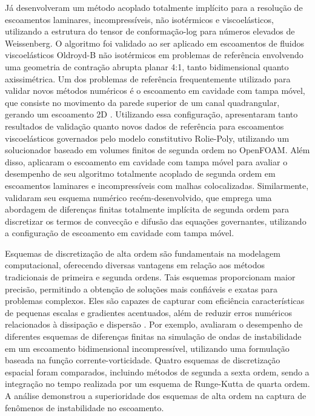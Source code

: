 Já  desenvolveram um método acoplado totalmente implícito para a resolução de escoamentos laminares, incompressíveis, não isotérmicos e viscoelásticos, utilizando a estrutura do tensor de conformação-log para números elevados de Weissenberg. O algoritmo foi validado ao ser aplicado em escoamentos de fluidos viscoelásticos Oldroyd-B não isotérmicos em problemas de referência envolvendo uma geometria de contração abrupta planar 4:1, tanto bidimensional quanto axissimétrica. Um dos problemas de referência frequentemente utilizado para validar novos métodos numéricos é o escoamento em cavidade com tampa móvel, que consiste no movimento da parede superior de um canal quadrangular, gerando um escoamento 2D \cite{Shankar2000}. Utilizando essa configuração,  apresentaram tanto resultados de validação quanto novos dados de referência para escoamentos viscoelásticos governados pelo modelo constitutivo Rolie-Poly, utilizando um solucionador baseado em volumes finitos de segunda ordem no OpenFOAM. Além disso,  aplicaram o escoamento em cavidade com tampa móvel para avaliar o desempenho de seu algoritmo totalmente acoplado de segunda ordem em escoamentos laminares e incompressíveis com malhas colocalizadas. Similarmente,  validaram seu esquema numérico recém-desenvolvido, que emprega uma abordagem de diferenças finitas totalmente implícita de segunda ordem para discretizar os termos de convecção e difusão das equações governantes, utilizando a configuração de escoamento em cavidade com tampa móvel.

Esquemas de discretização de alta ordem são fundamentais na modelagem computacional, oferecendo diversas vantagens em relação aos métodos tradicionais de primeira e segunda ordens. Tais esquemas proporcionam maior precisão, permitindo a obtenção de soluções mais confiáveis e exatas para problemas complexos. Eles são capazes de capturar com eficiência características de pequenas escalas e gradientes acentuados, além de reduzir erros numéricos relacionados à dissipação e dispersão \cite{Souza2005}. Por exemplo,  avaliaram o desempenho de diferentes esquemas de diferenças finitas na simulação de ondas de instabilidade em um escoamento bidimensional incompressível, utilizando uma formulação baseada na função corrente-vorticidade. Quatro esquemas de discretização espacial foram comparados, incluindo métodos de segunda a sexta ordem, sendo a integração no tempo realizada por um esquema de Runge-Kutta de quarta ordem. A análise demonstrou a superioridade dos esquemas de alta ordem na captura de fenômenos de instabilidade no escoamento.


